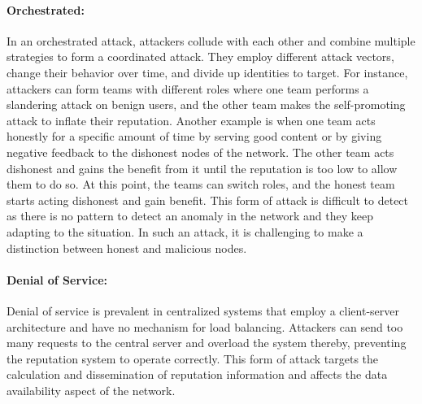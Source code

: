 \paragraph{Orchestrated:}In an orchestrated attack, attackers collude with
each other and combine multiple strategies to form a coordinated attack. They
employ different attack vectors, change their behavior over time, and divide up
identities to target. For instance, attackers can form teams with different
roles where one team performs a slandering attack on benign users, and the
other team makes the self-promoting attack to inflate their reputation. Another
example is when one team acts honestly for a specific amount of time by serving
good content or by giving negative feedback to the dishonest nodes of the
network. The other team acts dishonest and gains the benefit from it until the
reputation is too low to allow them to do so. At this point, the teams can
switch roles, and the honest team starts acting dishonest and gain benefit.
This form of attack is difficult to detect as there is no pattern to detect an
anomaly in the network and they keep adapting to the situation. In such an
attack, it is challenging to make a distinction between honest and malicious
nodes. 
\paragraph{Denial of Service:}Denial of service is prevalent in centralized systems that employ a client-server architecture and have no mechanism for load balancing. Attackers can send too many requests to the central server and overload the system thereby, preventing the reputation system to operate correctly. This form of attack targets the calculation and dissemination of reputation information and affects the data availability aspect of the network.  
